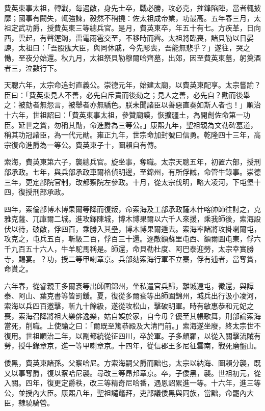 \begin{pinyinscope}
費英東事太祖，轉戰，每遇敵，身先士卒，戰必勝，攻必克，摧鋒陷陣，當者輒披靡；國事有闕失，輒強諫，毅然不稍撓：佐太祖成帝業，功最高。五年春三月，太祖定武功爵，授費英東三等總兵官。是月，費英東卒，年五十有七。方疾革，日向西，雲起，有聲鏗鍧，雷電雨雹交至，不移時而霽。太祖將臨喪，諸貝勒以日晏諫，太祖曰：「吾股肱大臣，與同休戚，今先彫喪，吾能無悲乎？」遂往，哭之慟，至夜分始還。秋九月，太祖祭貝勒穆爾哈齊墓，出郊，因至費英東墓，躬奠酒者三，泣數行下。

天聰六年，太宗命追封直義公。崇德元年，始建太廟，以費英東配享。太宗嘗諭？臣曰：「費英東見人不善，必先自斥責而後劾之；見人之善，必先自？勸而後舉之：被劾者無怨言，被舉者亦無驕色。朕未聞諸臣以善惡直奏如斯人者也！」順治十六年，世祖詔曰：「費英東事太祖，參贊廟謨，恢擴疆土，為開創佐命第一功臣。延世之賞，勿稱其勛，命進爵為三等公。」康熙九年，聖祖親為文勒碑墓道，稱其功冠諸臣，為一代元勛。雍正九年，世宗命加封號曰信勇。乾隆四十三年，高宗復命進爵為一等公。費英東子十，圖賴自有傳。

索海，費英東第六子，襲總兵官。旋坐事，奪職。太宗天聰五年，初置六部，授刑部承政。七年，與兵部承政車爾格偵明邊，至錦州，有所俘馘，命管牛錄事。崇德三年，更定部院官制，改都察院左參政。十月，從太宗伐明，略大凌河，下屯堡十四，復授刑部承政。

四年，索倫部博木博果爾等降而復叛，命索海及工部承政薩木什喀帥師往討之，克雅克薩、兀庫爾二城。進攻鐸陳城，博木博果爾以六千人來援，乘我師後，索海設伏以待，破敵，俘四百，乘勝入其壘，博木博果爾遁去。索海率諸將攻掛喇爾屯，攻克之，屯兵五百，斬級二百，俘百三十還。逐敵額蘇里屯西、額爾圖屯東，俘六千九百五十六人，牛羊駝馬稱是。師還，命貝勒杜度、阿巴泰迎勞，太宗幸實勝寺，賜宴。？功，授二等甲喇章京。兵部劾索海行軍不立寨，俘有逋者，當奪賞，命貰之。

六年春，從睿親王多爾袞等出師圍錦州，坐私遣官兵歸，離城遠屯，徵還，與譚泰、阿山、葉克書等皆罰鍰。夏，復從多爾袞等出師圍錦州，城兵出行汲小凌河，索海以兵四百邀擊，斬九十餘級，遂從攻松山，擊破明軍。時有敏惠恭和元妃之喪，索海召降將祖大樂俳逸樂，姑自娛於家，自今毋？優至其帳歌舞，刑部論索海當死，削職。上使諭之曰：「爾既至篤恭殿及大清門前。」索海遂坐廢，終太宗世不復用。世祖順治二年，以副都統從征四川，卒於軍。子多頗羅，以從入關擊流賊有勞，授牛錄章京，進一等甲喇章京。十四年，從信郡王多尼征雲南，戰死磨盤山。

倭黑，費英東諸孫。父察哈尼。方索海嗣父爵而黜也，太宗以納海、圖賴分襲，既又以事奪爵，復以察哈尼襲。尋改三等昂邦章京。卒，子倭黑，襲。世祖初元，從入關。四年，復更定爵秩，改三等精奇尼哈番，遇恩詔累進一等。十六年，進三等公，並授內大臣。康熙八年，聖祖譴鼇拜，吏部議倭黑與同族，當黜，命罷內大臣，隸驍騎營。


\end{pinyinscope}
